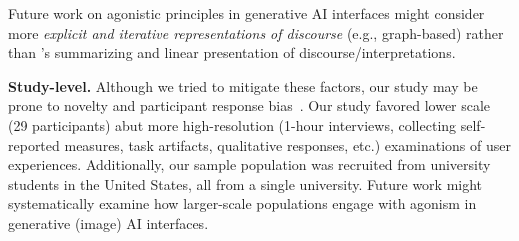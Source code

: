 Future work on agonistic principles in generative AI interfaces might consider more \textit{explicit and iterative representations of discourse} (e.g., graph-based) rather than \agonistic's summarizing and linear presentation of discourse/interpretations.



\textbf{Study-level.}
Although we tried to mitigate these factors, our study may be prone to novelty and participant response bias~\cite{dell2012yoursbetter}.
Our study favored lower scale (29 participants) abut more high-resolution (1-hour interviews, collecting self-reported measures, task artifacts, qualitative responses, etc.) examinations of user experiences.
Additionally, our sample population was recruited from university students in the United States, all from a single university. 
Future work might systematically examine how larger-scale populations engage with agonism in generative (image) AI interfaces.

